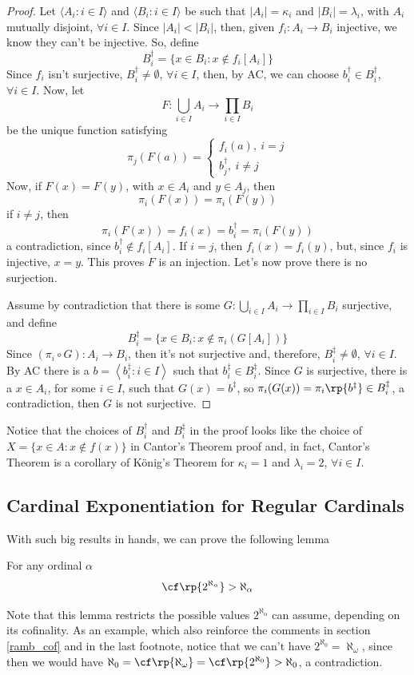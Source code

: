 \begin{proof}
    Let $\langle A_i:i\in I\rangle$ and $\langle B_i:i\in I\rangle$ be such that $|A_i|=\kappa_i$ and $|B_i|=\lambda_i$, with $A_i$ mutually disjoint, $\forall i\in I$. Since $|A_i|<|B_i|$, then, given $f_i:A_i\to B_i$ injective, we know they can't be injective. So, define
    $$B_i^\dagger=\{x\in B_i:x\notin f_i[A_i]\}$$
    Since $f_i$ isn't surjective, $B_i^\dagger\neq\emptyset$, $\forall i\in I$, then, by AC, we can choose $b_i^\dagger\in B_i^\dagger$, $\forall i\in I$. Now, let
    $$F:\bigcup_{i\in I}A_i\to\prod_{i\in I}B_i$$
    be the unique function satisfying
    $$\pi_j(F(a))=\begin{cases}
        f_i(a),~i=j\\
        b_j^\dagger,~i\neq j
    \end{cases}$$
    Now, if $F(x)=F(y)$, with $x\in A_i$ and $y\in A_j$, then
    $$\pi_i(F(x))=\pi_i(F(y))$$
    if $i\neq j$, then
    $$\pi_i(F(x))=f_i(x)=b_i^\dagger=\pi_i(F(y))$$
    a contradiction, since $b_i^\dagger\notin f_i[A_i]$. If $i=j$, then $f_i(x)=f_i(y)$, but, since $f_i$ is injective, $x=y$. This proves $F$ is an injection. Let's now prove there is no surjection.

    Assume by contradiction that there is some $G:\bigcup_{i\in I}A_i\to\prod_{i\in I}B_i$ surjective, and define
    $$B_i^\ddagger=\{x\in B_i:x\notin \pi_i(G[A_i])\}$$
    Since $(\pi_i\circ G):A_i\to B_i$, then it's not surjective and, therefore, $B_i^\ddagger\neq\emptyset$, $\forall i\in I$. By AC there is a $b=\left\langle b_i^\ddagger:i \in I\right\rangle$ such that $b_i^\ddagger\in B_i^\ddagger$. Since $G$ is surjective, there is a $x\in A_i$, for some $i\in I$, such that $G(x)=b^\ddagger$, so $\pi_i(G(x))=\pi_i\rp{b^\ddagger}\in B_i^\ddagger$, a contradiction, then $G$ is not surjective.
\end{proof}

Notice that the choices of $B_i^\dagger$ and $B_i^\ddagger$ in the proof looks like the choice of $X=\{x\in A:x\notin f(x)\}$ in Cantor's Theorem proof and, in fact, Cantor's Theorem is a corollary of König's Theorem for $\kappa_i=1$ and $\lambda_i=2$, $\forall i\in I$.

\subsection{Cardinal Exponentiation for Regular Cardinals}

With such big results in hands, we can prove the following lemma
\begin{lemma}{}{}
    For any ordinal $\alpha$
    $$\cf\rp{2^{\aleph_\alpha}}>\aleph_\alpha$$
\end{lemma}
Note that this lemma restricts the possible values $2^{\aleph_\alpha}$ can assume, depending on its cofinality. As an example, which also reinforce the comments in section \ref{ramb_cof} and in the last footnote, notice that we can't have $2^{\aleph_0}=\aleph_\omega$, since then we would have $\aleph_0=\cf\rp{\aleph_\omega}=\cf\rp{2^{\aleph_0}}>\aleph_0$, a contradiction.

